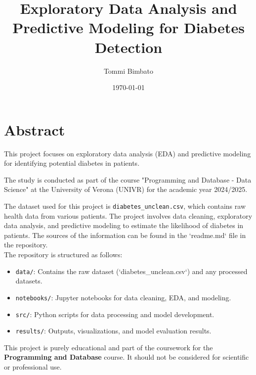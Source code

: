 \documentclass[12pt]{article}
\begin{document}
\title{Exploratory Data Analysis and Predictive Modeling for Diabetes Detection}
\author{Tommi Bimbato}
\date{\today}

\maketitle

\section*{Abstract}

This project focuses on exploratory data analysis (EDA) and predictive modeling for identifying potential diabetes in patients. 

The study is conducted as part of the course "Programming and Database - Data Science" at the University of Verona (UNIVR) for the academic year 2024/2025.


The dataset used for this project is \texttt{diabetes\_unclean.csv}, which contains raw health data from various patients. 
The project involves data cleaning, exploratory data analysis, and predictive modeling to estimate the likelihood of diabetes in patients. 
The sources of the information can be found in the `readme.md` file in the repository.\\

The repository is structured as follows: \begin{itemize}
\item\texttt{data/}: Contains the raw dataset (`diabetes\_unclean.csv`) and any processed datasets.
\item\texttt{notebooks/}: Jupyter notebooks for data cleaning, EDA, and modeling.
\item\texttt{src/}: Python scripts for data processing and model development.
\item\texttt{results/}: Outputs, visualizations, and model evaluation results.
\end{itemize}
This project is purely educational and part of the coursework for the \textbf{Programming and Database} course. It should not be considered for scientific or professional use.
\end{document}
